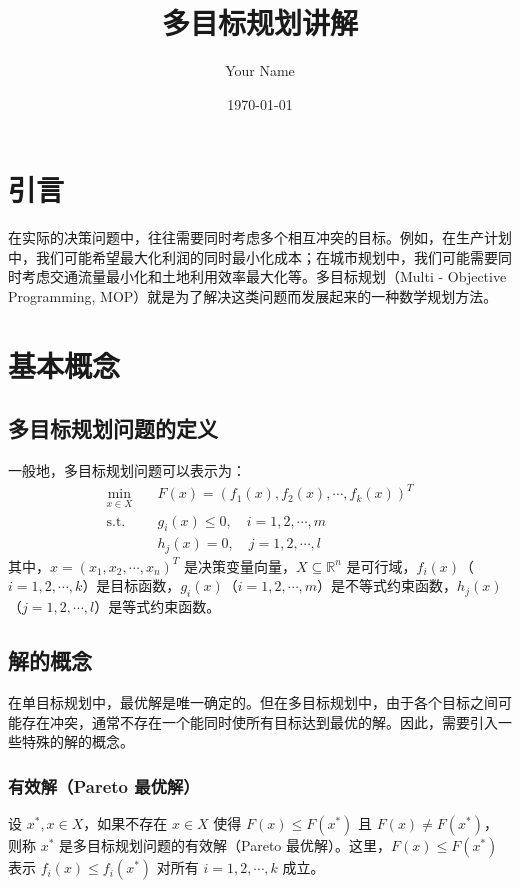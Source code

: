 \documentclass{article}
\title{多目标规划讲解}
\author{Your Name}
\date{\today}
\begin{document}
\maketitle

\section{引言}
在实际的决策问题中，往往需要同时考虑多个相互冲突的目标。例如，在生产计划中，我们可能希望最大化利润的同时最小化成本；在城市规划中，我们可能需要同时考虑交通流量最小化和土地利用效率最大化等。多目标规划（Multi - Objective Programming, MOP）就是为了解决这类问题而发展起来的一种数学规划方法。

\section{基本概念}
\subsection{多目标规划问题的定义}
一般地，多目标规划问题可以表示为：
\begin{align}
\min_{x \in X} \quad & F(x) = (f_1(x), f_2(x), \cdots, f_k(x))^T \\
\text{s.t.} \quad & g_i(x) \leq 0, \quad i = 1, 2, \cdots, m \\
& h_j(x) = 0, \quad j = 1, 2, \cdots, l
\end{align}
其中，$x=(x_1,x_2,\cdots,x_n)^T$ 是决策变量向量，$X \subseteq \mathbb{R}^n$ 是可行域，$f_i(x)$（$i = 1, 2, \cdots, k$）是目标函数，$g_i(x)$（$i = 1, 2, \cdots, m$）是不等式约束函数，$h_j(x)$（$j = 1, 2, \cdots, l$）是等式约束函数。

\subsection{解的概念}
在单目标规划中，最优解是唯一确定的。但在多目标规划中，由于各个目标之间可能存在冲突，通常不存在一个能同时使所有目标达到最优的解。因此，需要引入一些特殊的解的概念。

\subsubsection{有效解（Pareto 最优解）}
设 $x^*, x \in X$，如果不存在 $x \in X$ 使得 $F(x) \leq F(x^*)$ 且 $F(x) \neq F(x^*)$，则称 $x^*$ 是多目标规划问题的有效解（Pareto 最优解）。这里，$F(x) \leq F(x^*)$ 表示 $f_i(x) \leq f_i(x^*)$ 对所有 $i = 1, 2, \cdots, k$ 成立。
\end{document}
